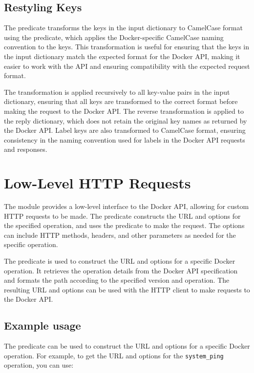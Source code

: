 \subsection{Restyling Keys}

The  predicate transforms the keys in the input dictionary to
CamelCase format using the  predicate, which applies the
Docker-specific CamelCase naming convention to the keys. This
transformation is useful for ensuring that the keys in the input
dictionary match the expected format for the Docker API, making it
easier to work with the API and ensuring compatibility with the expected
request format.

The transformation is applied recursively to all
key-value pairs in the input dictionary, ensuring that all keys are
transformed to the correct format before making the request to the
Docker API. The reverse transformation is applied to the reply
dictionary, which does not retain the original key names as returned by
the Docker API. Label keys are also transformed to CamelCase format,
ensuring consistency in the naming convention used for labels in the
Docker API requests and responses.

\section{Low-Level HTTP Requests}

The module provides a low-level interface to the Docker API, allowing for custom
HTTP requests to be made. The  predicate constructs the URL and
options for the specified operation, and uses the  predicate to make
the request. The options can include HTTP methods, headers, and other parameters
as needed for the specific operation.

The  predicate is used to construct the URL and options for a
specific Docker operation. It retrieves the operation details from the Docker
API specification and formats the path according to the specified version and
operation. The resulting URL and options can be used with the HTTP client to
make requests to the Docker API.

\subsection{Example usage}

The  predicate can be used to construct the URL and options for a
specific Docker operation. For example, to get the URL and options for the
\verb$system_ping$ operation, you can use:

